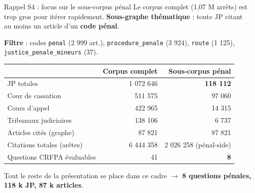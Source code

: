 \documentclass[aspectratio=169,10pt]{beamer}
\newcommand{\keybox}[1]{%
  \begin{center}
  \colorbox{accentsoft}{\parbox{0.92\linewidth}{\centering #1}}
  \end{center}}
\begin{document}
\begin{frame}{Rappel S4 : focus sur le sous-corpus pénal}
  \footnotesize
  Le corpus complet (1,07 M arrêts) est trop gros pour itérer rapidement.
  \textbf{Sous-graphe thématique} : toute JP citant au moins un article d'un \textbf{code pénal}.

  \vspace{0.4em}
  \textbf{Filtre} : codes \texttt{penal} (2 999 art.), \texttt{procedure\_penale} (3 924),
  \texttt{route} (1 125), \texttt{justice\_penale\_mineurs} (37).

  \vspace{0.6em}
  \renewcommand{\arraystretch}{1.2}
  \begin{center}
  \begin{tabular}{@{}l r r@{}}
    \toprule
     & \textbf{Corpus complet} & \textbf{Sous-corpus pénal} \\
    \midrule
    JP totales      & 1 072 646 & \textbf{118 112} \\
    \quad Cour de cassation       & 511 575   & 97 060 \\
    \quad Cours d'appel           & 422 965   & 14 315 \\
    \quad Tribunaux judiciaires   & 138 106   & 6 737 \\
    Articles cités (graphe)       & 87 821    & 87 821 \\
    Citations totales (arêtes)    & 6 444 358 & 2 026 258 (pénal-side) \\
    Questions CRFPA évaluables    & 41        & \textbf{8} \\
    \bottomrule
  \end{tabular}
  \end{center}

  \vspace{0.5em}
  \keybox{Tout le reste de la présentation se place dans ce cadre $\to$
  \textbf{8 questions pénales, 118 k JP, 87 k articles}.}
\end{frame}
\end{document}
